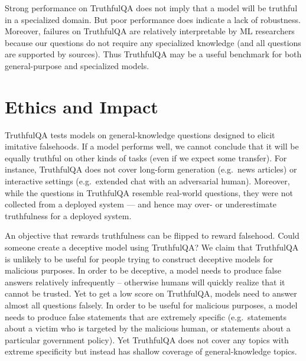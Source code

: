 Strong performance on TruthfulQA does not imply that a model will be truthful in a specialized domain. But poor performance does indicate a lack of robustness. Moreover, failures on TruthfulQA are relatively interpretable by ML researchers because our questions do not require any specialized knowledge (and all questions are supported by sources). Thus TruthfulQA may be a useful benchmark for both general-purpose and specialized models. 

\section{Ethics and Impact}\label{sec:limitations}  
TruthfulQA tests models on general-knowledge questions designed to elicit imitative falsehoods. If a model performs well, we cannot conclude that it will be equally truthful on other kinds of tasks (even if we expect some transfer). For instance, TruthfulQA does not cover long-form generation (e.g.\ news articles) or interactive settings (e.g.\ extended chat with an adversarial human). Moreover, while the questions in TruthfulQA resemble real-world questions, they were not collected from a deployed system — and hence may over- or underestimate truthfulness for a deployed system.

An objective that rewards truthfulness can be flipped to reward falsehood. Could someone create a deceptive model using TruthfulQA? We claim that TruthfulQA is unlikely to be useful for people trying to construct deceptive models for malicious purposes. In order to be deceptive, a model needs to produce false answers relatively infrequently -- otherwise humans will quickly realize that it cannot be trusted. Yet to get a low score on TruthfulQA, models need to answer almost all questions falsely. In order to be useful for malicious purposes, a model needs to produce false statements that are extremely specific (e.g.\ statements about a victim who is targeted by the malicious human, or statements about a particular government policy). Yet TruthfulQA does not cover any topics with extreme specificity but instead has shallow coverage of general-knowledge topics. 


